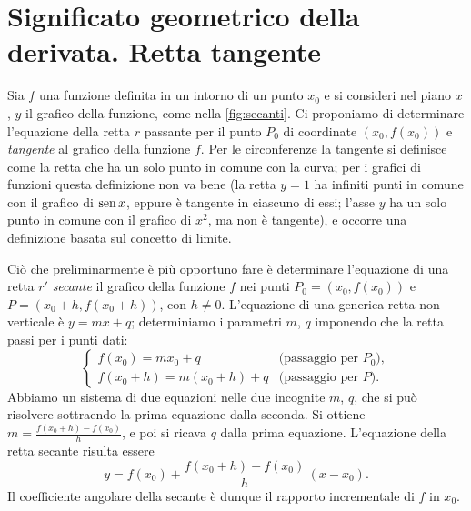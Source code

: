 \section{Significato geometrico della derivata. Retta tangente}
\label{sec:retta-tangente}

Sia $f$ una funzione definita in un intorno di un punto $x_{0}$ e si consideri nel piano
$x$, $y$ il grafico della funzione, come nella \cref{fig:secanti}. Ci proponiamo di
determinare l'equazione della retta $r$ passante per il punto $P_{0}$ di coordinate
$(x_{0},f(x_{0}))$ e \emph{tangente} al grafico della funzione $f$. Per le circonferenze la
tangente si definisce come la retta che ha un solo punto in comune con la curva; per i
grafici di funzioni questa definizione non va bene (la retta $y=1$ ha infiniti punti in
comune con il grafico di $\operatorname{sen} x$, eppure è tangente in ciascuno di essi; l'asse $y$ ha un
solo punto in comune con il grafico di $x^{2}$, ma non è tangente), e occorre una
definizione basata sul concetto di limite.

Ciò che preliminarmente è più opportuno fare è determinare l'equazione di una retta $r'$
\emph{secante} il grafico della funzione $f$ nei punti $P_{0}=(x_{0},f(x_{0}))$ e
$P=(x_{0}+h,f(x_{0}+h))$, con $h\neq0$. L'equazione di una generica retta non verticale è
$y=mx+q$; determiniamo i parametri $m$, $q$ imponendo che la retta passi per i punti dati:
\begin{equation}\label{eq:sistema-secante}
  \begin{cases}
    f(x_{0})=mx_{0}+q & \text{(passaggio per } P_{0}),\\
    f(x_{0}+h)=m(x_{0}+h)+q & \text{(passaggio per } P).
  \end{cases}
\end{equation}
Abbiamo un sistema di due equazioni nelle due incognite $m$, $q$, che si può risolvere
sottraendo la prima equazione dalla seconda. Si ottiene $m=\frac{f(x_{0}+h)-f(x_{0})}{h}$,
e poi si ricava $q$ dalla prima equazione. L'equazione della retta secante risulta essere
\begin{equation}\label{eq:retta-secante}
  y=f(x_{0})+\frac{f(x_{0}+h)-f(x_{0})}{h}\,(x-x_{0}).
\end{equation}
Il coefficiente angolare della secante è dunque il rapporto incrementale di $f$ in $x_{0}$.

